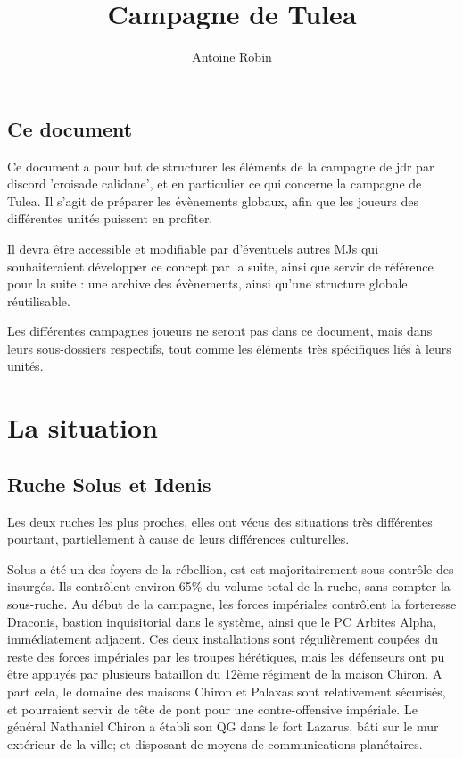 \documentclass[10pt,a4paper]{book}
\author{ Antoine Robin}
\title{Campagne de Tulea}
\begin{document}
\section*{Ce document}
Ce document a pour but de structurer les éléments de la campagne de jdr par discord 'croisade calidane', et en particulier ce qui concerne la campagne de Tulea. Il s'agit de préparer les évènements globaux, afin que les joueurs des différentes unités puissent en profiter.

Il devra être accessible et modifiable par d'éventuels autres MJs qui souhaiteraient développer ce concept par la suite, ainsi que servir de référence pour la suite : une archive des évènements, ainsi qu'une structure globale réutilisable.

Les différentes campagnes joueurs ne seront pas dans ce document, mais dans leurs sous-dossiers respectifs, tout comme les éléments très spécifiques liés à leurs unités.
\chapter{La situation}
\section{Ruche Solus et Idenis}
Les deux ruches les plus proches, elles ont vécus des situations très différentes pourtant, partiellement à cause de leurs différences culturelles.

Solus a été un des foyers de la rébellion, est est majoritairement sous contrôle des insurgés. Ils contrôlent environ 65\% du volume total de la ruche, sans compter la sous-ruche. Au début de la campagne, les forces impériales contrôlent la forteresse Draconis, bastion inquisitorial dans le système, ainsi que le PC Arbites Alpha, immédiatement adjacent. Ces deux installations sont régulièrement coupées du reste des forces impériales par les troupes hérétiques, mais les défenseurs ont pu être appuyés par plusieurs bataillon du 12ème régiment de la maison Chiron. A part cela, le domaine des maisons Chiron et Palaxas sont relativement sécurisés, et pourraient servir de tête de pont pour une contre-offensive impériale. Le général Nathaniel Chiron a établi son QG dans le fort Lazarus, bâti sur le mur extérieur de la ville; et disposant de moyens de communications planétaires.
\end{document}
